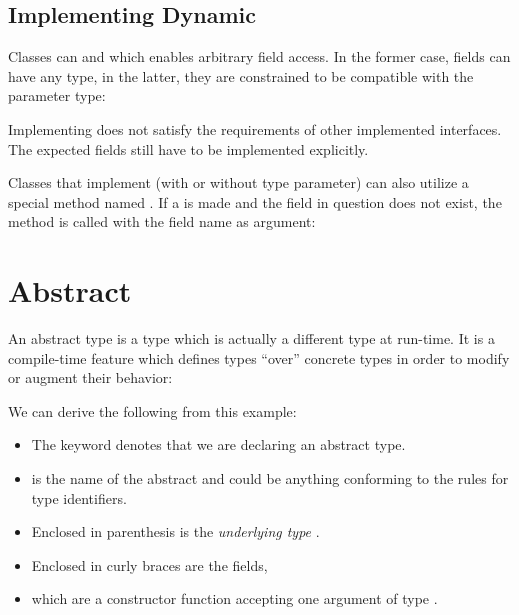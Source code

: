 \subsection{Implementing Dynamic}
\label{types-dynamic-implemented}

Classes can   and  which enables arbitrary field access. In the former case, fields can have any type, in the latter, they are constrained to be compatible with the parameter type:


Implementing  does not satisfy the requirements of other implemented interfaces. The expected fields still have to be implemented explicitly.

Classes that implement  (with or without type parameter) can also utilize a special method named . If a  is made and the field in question does not exist, the  method is called with the field name as argument:




\section{Abstract}
\label{types-abstract}

An abstract type is a type which is actually a different type at run-time. It is a compile-time feature which defines types ``over'' concrete types in order to modify or augment their behavior:

We can derive the following from this example:

\begin{itemize}
	\item The keyword  denotes that we are declaring an abstract type.
	\item {} is the name of the abstract and could be anything conforming to the rules for type identifiers.
	\item Enclosed in parenthesis \expr{()} is the \emph{underlying type} .
	\item Enclosed in curly braces \expr{$\left\{\right\}$} are the fields,
	\item which are a constructor function  accepting one argument  of type .
\end{itemize}

